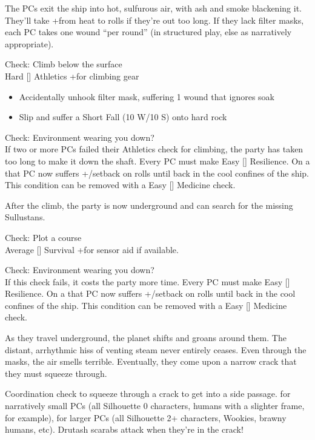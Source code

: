 \documentclass{book}
\newcommand{\df}{\difficulty}
\begin{document}
\begin{multicols}{2}
The PCs exit the ship into hot, sulfurous air, with ash and smoke blackening it. They’ll take +\setback from heat to rolls if they’re out too long. If they lack filter masks, each PC takes one wound ``per round'' (in structured play, else as narratively appropriate).

Check: Climb below the surface\\
Hard [\df\df\df] Athletics +\boost for climbing gear
\begin{itemize}
  \item \threat\threat Accidentally unhook filter mask, suffering 1 wound that ignores soak
  \item \despair Slip and suffer a  Short Fall (10 W/10 S) onto hard rock
\end{itemize}

Check: Environment wearing you down?\\
If two or more PCs failed their Athletics check for climbing, the party has taken too long to make it down the shaft. Every PC must make Easy [\df] Resilience. On a \failure that PC now suffers +/setback on rolls until back in the cool confines of the ship. This condition can be removed with a Easy [\df] Medicine check.

After the climb, the party is now underground and can search for the missing Sullustans. 

Check: Plot a course\\
Average [\df\df] Survival +\boost for sensor aid if available.

Check: Environment wearing you down?\\
If this check fails, it costs the party more time. Every PC must make Easy [\df] Resilience. On a \failure that PC now suffers +/setback on rolls until back in the cool confines of the ship. This condition can be removed with a Easy [\df] Medicine check.

As they travel underground, the planet shifts and groans around them. The distant, arrhythmic hiss of venting steam never entirely ceases. Even through the masks, the air smells terrible. Eventually, they come upon a narrow crack that they must squeeze through.

\df\df Coordination check to squeeze through a crack to get into a side passage. \boost for narratively small PCs (all Silhouette 0 characters, humans with a slighter frame, for example), \setback for larger PCs (all Silhouette 2+ characters, Wookies, brawny humans, etc). Drutash scarabs attack when they’re in the crack!


\end{multicols}
\end{document}
